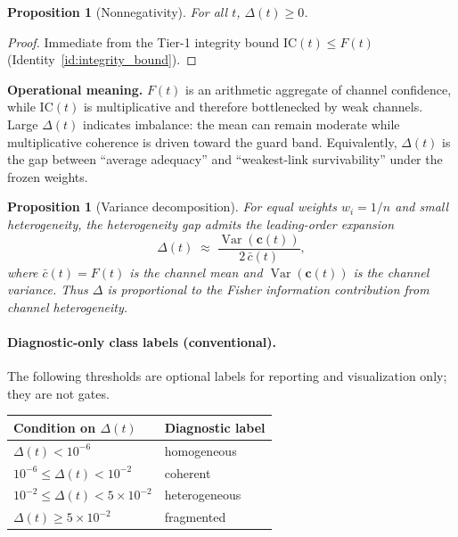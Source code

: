 \documentclass[
  aps,
  prd,
  preprint,
  superscriptaddress,
  nofootinbib,
  floatfix
]{revtex4-2}
\newcommand{\IC}{\mathrm{IC}}
\newtheorem{proposition}[theorem]{Proposition}
\begin{document}
\begin{proposition}[Nonnegativity]
\label{prop:delta_nonneg}
For all $t$, $\Delta(t)\ge 0$.
\end{proposition}

\begin{proof}
Immediate from the Tier-1 integrity bound $\IC(t)\le F(t)$ (Identity~\ref{id:integrity_bound}).
\end{proof}

\noindent\textbf{Operational meaning.}
$F(t)$ is an arithmetic aggregate of channel confidence, while $\IC(t)$ is multiplicative and therefore bottlenecked by weak channels.
Large $\Delta(t)$ indicates imbalance: the mean can remain moderate while multiplicative coherence is driven toward the guard band.
Equivalently, $\Delta(t)$ is the gap between ``average adequacy'' and ``weakest-link survivability'' under the frozen weights.

\begin{proposition}[Variance decomposition]
\label{prop:delta_variance}
For equal weights $w_i = 1/n$ and small heterogeneity, the heterogeneity gap admits the leading-order expansion
\begin{equation}
  \Delta(t) \;\approx\; \frac{\operatorname{Var}(\bm{c}(t))}{2\,\bar{c}(t)},
\end{equation}
where $\bar{c}(t) = F(t)$ is the channel mean and $\operatorname{Var}(\bm{c}(t))$ is the channel variance.
Thus $\Delta$ is proportional to the Fisher information contribution from channel heterogeneity.
\end{proposition}

\paragraph{Diagnostic-only class labels (conventional).}
The following thresholds are optional labels for reporting and visualization only; they are not gates.
\begin{center}
\begin{tabular}{@{}ll@{}}
\toprule
Condition on $\Delta(t)$ & Diagnostic label \\
\midrule
$\Delta(t) < 10^{-6}$ & homogeneous \\
$10^{-6} \le \Delta(t) < 10^{-2}$ & coherent \\
$10^{-2} \le \Delta(t) < 5\times 10^{-2}$ & heterogeneous \\
$\Delta(t) \ge 5\times 10^{-2}$ & fragmented \\
\bottomrule
\end{tabular}
\end{center}
\end{document}
